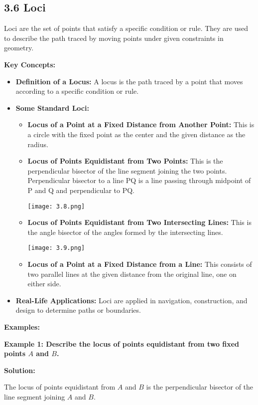 
\subsection*{3.6 Loci}
Loci are the set of points that satisfy a specific condition or rule. They are used to describe the path traced by moving points under given constraints in geometry.

\textbf{Key Concepts:}
\begin{itemize}
	\item \textbf{Definition of a Locus:} A locus is the path traced by a point that moves according to a specific condition or rule.
	\item \textbf{Some Standard Loci:}
	\begin{itemize}
		\item \textbf{Locus of a Point at a Fixed Distance from Another Point:} This is a circle with the fixed point as the center and the given distance as the radius.
		\item \textbf{Locus of Points Equidistant from Two Points:} This is the perpendicular bisector of the line segment joining the two points. Perpendicular bisector to a line PQ is a line passing through midpoint of P and Q and perpendicular to PQ.
		\begin{center}
			\texttt{[image: 3.8.png]}
		\end{center}
		\item \textbf{Locus of Points Equidistant from Two Intersecting Lines:} This is the angle bisector of the angles formed by the intersecting lines.
		\begin{center}
			\texttt{[image: 3.9.png]}
		\end{center}
		\item \textbf{Locus of a Point at a Fixed Distance from a Line:} This consists of two parallel lines at the given distance from the original line, one on either side.
	\end{itemize}
	\item \textbf{Real-Life Applications:} Loci are applied in navigation, construction, and design to determine paths or boundaries.
\end{itemize}

\textbf{Examples:}

\begin{flushleft}
	\textbf{Example 1: Describe the locus of points equidistant from two fixed points $A$ and $B$.}
	
	\vspace{0.5cm}
	\textbf{Solution:}
	\vspace{0.5cm}
	
	The locus of points equidistant from $A$ and $B$ is the perpendicular bisector of the line segment joining $A$ and $B$.
\end{flushleft}

